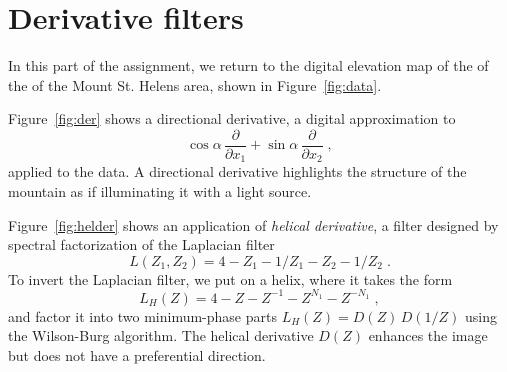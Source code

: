 \lstset{language=python,numbers=left,numberstyle=\tiny,showstringspaces=false}


\section{Derivative filters}

In this part of the assignment, we return to the digital elevation map
of the of the of the Mount St. Helens area, shown in
Figure~\ref{fig:data}.


Figure~\ref{fig:der} shows a directional derivative, a digital approximation to
\begin{equation}
\label{eq:der}
\cos{\alpha}\,\frac{\partial}{\partial x_1} + \sin{\alpha}\,\frac{\partial}{\partial x_2}\;,
\end{equation}
applied to the data. A directional derivative highlights the structure
of the mountain as if illuminating it with a light source.


Figure~\ref{fig:helder} shows an application of \emph{helical
derivative}, a filter designed by spectral factorization of the
Laplacian filter
\begin{equation}
\label{eq:lap4}
L(Z_1,Z_2) = 4 - Z_1 - 1/Z_1 - Z_2 - 1/Z_2\;.
\end{equation}
To invert the Laplacian filter, we put on a helix, where it takes
the form
\begin{equation}
\label{eq:lap1}
L_H(Z) = 4 - Z - Z^{-1} - Z^{N_1} - Z^{-N_1}\;,
\end{equation} 
and factor it into two minimum-phase parts $L_H(Z) = D(Z)\,D(1/Z)$
using the Wilson-Burg algorithm. The helical derivative $D(Z)$
enhances the image but does not have a preferential direction.


